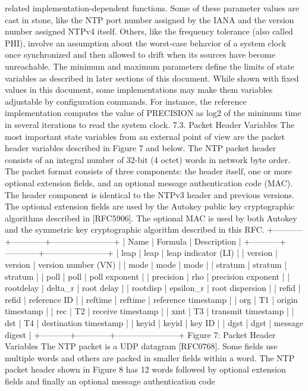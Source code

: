  related implementation-dependent functions. Some of these parameter
 values are cast in stone, like the NTP port number assigned by the
 IANA and the version number assigned NTPv4 itself. Others, like the
 frequency tolerance (also called PHI), involve an assumption about
 the worst-case behavior of a system clock once synchronized and then
 allowed to drift when its sources have become unreachable. The
 minimum and maximum parameters define the limits of state variables
 as described in later sections of this document.
 While shown with fixed values in this document, some implementations
 may make them variables adjustable by configuration commands. For
 instance, the reference implementation computes the value of
 PRECISION as log2 of the minimum time in several iterations to read
 the system clock.
7.3. Packet Header Variables
 The most important state variables from an external point of view are
 the packet header variables described in Figure 7 and below. The NTP
 packet header consists of an integral number of 32-bit (4 octet)
 words in network byte order. The packet format consists of three
 components: the header itself, one or more optional extension fields,
 and an optional message authentication code (MAC). The header
 component is identical to the NTPv3 header and previous versions.
 The optional extension fields are used by the Autokey public key
 cryptographic algorithms described in [RFC5906]. The optional MAC is
 used by both Autokey and the symmetric key cryptographic algorithm
 described in this RFC.
 +-----------+------------+-----------------------+
 | Name | Formula | Description |
 +-----------+------------+-----------------------+
 | leap | leap | leap indicator (LI) |
 | version | version | version number (VN) |
 | mode | mode | mode |
 | stratum | stratum | stratum |
 | poll | poll | poll exponent |
 | precision | rho | precision exponent |
 | rootdelay | delta_r | root delay |
 | rootdisp | epsilon_r | root dispersion |
 | refid | refid | reference ID |
 | reftime | reftime | reference timestamp |
 | org | T1 | origin timestamp |
 | rec | T2 | receive timestamp |
 | xmt | T3 | transmit timestamp |
 | dst | T4 | destination timestamp |
 | keyid | keyid | key ID |
 | dgst | dgst | message digest |
 +-----------+------------+-----------------------+
 Figure 7: Packet Header Variables
 The NTP packet is a UDP datagram [RFC0768]. Some fields use multiple
 words and others are packed in smaller fields within a word. The NTP
 packet header shown in Figure 8 has 12 words followed by optional
 extension fields and finally an optional message authentication code
